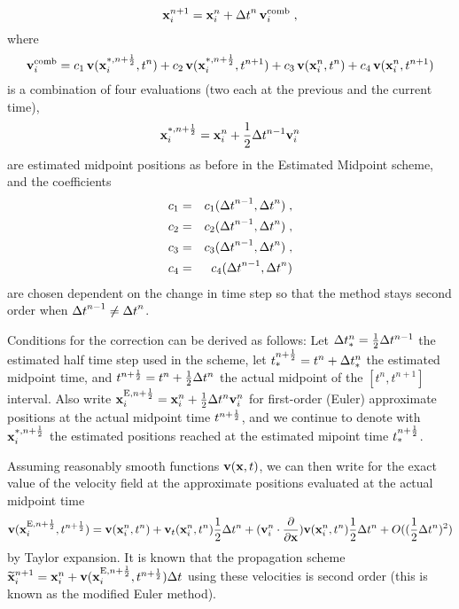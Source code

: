\begin{itemize}
\begin{equation}
\label{Eqn:EstiMidpoint2}
{\bf x}_i^{n+1} = {\bf x}_i^n +   {{\Delta t}}^n \, {\bf v}_i^{\mathrm{comb}}      \;,
\end{equation}
where
\begin{equation}
\label{Eqn:pt_em2-2}
{\bf v}_i^{\mathrm{comb}} =
c_1\,{\bf v}({\bf x}_i^{*,n+\frac12},t^{n})   +
c_2\,{\bf v}({\bf x}_i^{*,n+\frac12},t^{n+1})   +
c_3\,{\bf v}({\bf x}_i^{n},t^{n})   +
c_4\,{\bf v}({\bf x}_i^{n},t^{n+1})
\end{equation}
is a combination of four evaluations (two each at the previous and the current time),
\begin{equation*}
{\bf x}_i^{*,n+\frac12} = {\bf x}_i^n + \frac12 \Delta t^{n-1} {\bf v}_i^n
\end{equation*}
are estimated midpoint positions as before in the Estimated Midpoint scheme,
and the coefficients
\begin{eqnarray*}
c_1&=&c_1({\Delta t}^{n-1},{\Delta t}^n)\;,\\
c_2&=&c_2({\Delta t}^{n-1},{\Delta t}^n)\;,\\
c_3&=&c_3({\Delta t}^{n-1},{\Delta t}^n)\;,\\
c_4&=&c_4({\Delta t}^{n-1},{\Delta t}^n)
\end{eqnarray*}
are chosen dependent on the change in time step so that the method stays
second order when ${\Delta t}^{n-1} \neq {\Delta t}^n$.


Conditions for the correction can be derived as follows:
Let 
$\Delta t_{*}^{n}=\frac12 \Delta t^{n-1}$  the estimated half time step
used in the scheme, let $t_{*}^{n+\frac12}=t^n + \Delta t_{*}^{n}$ the estimated midpoint time,
and $t^{n+\frac12}=t^n + \frac12 \Delta t^{n}$ the actual midpoint of the $[t^n,t^{n+1}]$ interval.
Also write ${\bf x}_i^{{\mathrm{E}},n+\frac12} = {\bf x}_i^{n}+ \frac12 \Delta t^{n}{\bf v}_i^{n}$ for 
first-order (Euler) approximate positions
at the actual midpoint time $t^{n+\frac12}$,
and we continue to denote with ${\bf x}_i^{*,n+\frac12}$ the estimated positions 
reached at the estimated mipoint time $t_{*}^{n+\frac12}$.

Assuming reasonably smooth functions ${\bf v}({\bf x},t)$,
we can then write 
 for the exact value of the velocity field at the approximate
positions
evaluated at the actual midpoint time
\begin{equation}
    \label{Eqn:vhalf_expansion}
{\bf v}({\bf x}_i^{{\mathrm{E}},n+\frac12},t^{n+\frac12}) = 
   {\bf v}({\bf x}_i^{n},t^{n}) +
      {\bf v}_t({\bf x}_i^{n},t^{n})\frac12 \Delta t^{n} +
      ({\bf v}_i^{n} \cdot \frac{\partial}{\partial {\bf x}}) {\bf v}({\bf x}_i^{n},t^{n})\frac12 \Delta t^{n} +
         O((\frac12 \Delta t^{n})^2)
\end{equation}
by Taylor expansion. 
It is known that the propagation scheme
$\widetilde{{\bf x}}_i^{n+1}={\bf x}_i^{n}+{\bf v}({\bf x}_i^{{\mathrm{E}},n+\frac12},t^{n+\frac12}) {\Delta t}$ 
using these velocities is second order
(this is known as the modified Euler method).



\end{itemize}

